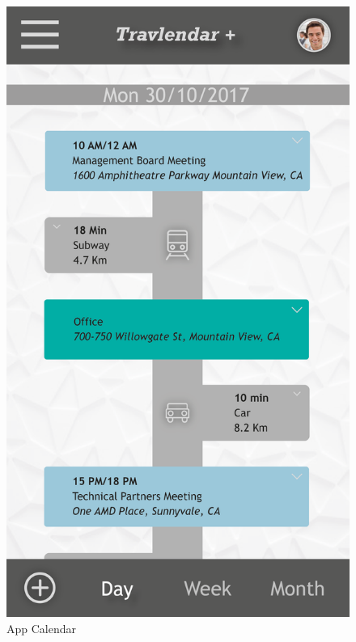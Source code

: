 \vspace*{-0.8cm}
\begin{figure}[!h]
	\centering
	\begin{minipage}{.275\textwidth}
		\centering
		\includegraphics[width=\linewidth]{Images/Mockups/MockupCalendarApp.png}
		\caption{App Calendar}
	\end{minipage}%
	\hspace*{1cm}
	\begin{minipage}{.65\textwidth}

\end{minipage}
\end{figure}
